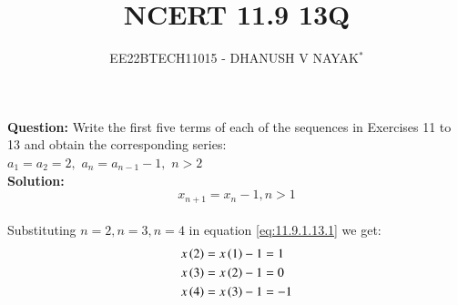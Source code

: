 \documentclass[journal,12pt,twocolumn]{IEEEtran}
\theoremstyle{remark}
\begin{document}

\title{NCERT 11.9 13Q}
\author{EE22BTECH11015 - DHANUSH V NAYAK$^{*}$%
}
\maketitle
\newpage
\bigskip
\renewcommand{\thefigure}{\arabic{figure}}
\renewcommand{\thetable}{\theenumi}
\textbf{Question:} Write the first five terms of each of the sequences in Exercises 11 to 13 and obtain the corresponding series:\\
$a_1=a_2=2,$\hspace{5pt} $a_n=a_{n-1} -1,$\hspace{5pt} $n>2$\\
\textbf{Solution:}
\begin{equation}\label{eq:11.9.1.13.1}
    x_{n+1}=x_{n} -1 , n>1
\end{equation}\\
Substituting $n=2 , n=3 , n=4$ in equation \eqref{eq:11.9.1.13.1} we get:
\begin{align}
    x\left(2\right) &= x\left(1\right) - 1 = 1  \\
    x\left(3\right) &= x\left(2\right) - 1 = 0\\
    x\left(4\right) &= x\left(3\right) - 1 = -1 
\end{align}
\end{document}
